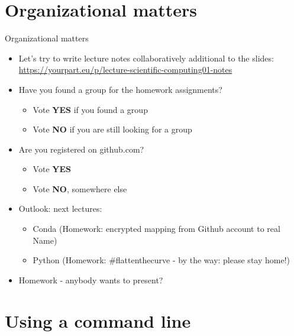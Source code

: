 
\subtitle{Command line, GIT and version control}
\date{2020-03-19}


\begin{frame}

	\tableofcontents

\end{frame}

\section{Organizational matters}
\begin{frame}[fragile]{Organizational matters}
    \begin{itemize}
        \item Let's try to write lecture notes collaboratively additional to the slides:
            \href{https://yourpart.eu/p/lecture-scientific-computing01-notes}{https://yourpart.eu/p/lecture-scientific-computing01-notes}\pause
        \item Have you found a group for the homework assignments?
        \begin{itemize}
            \item Vote {\bf YES} if you found a group
            \item Vote {\bf NO} if you are still looking for a group
        \end{itemize}\pause
        \item Are you registered on github.com?
        \begin{itemize}
            \item Vote {\bf YES}
            \item Vote {\bf NO}, somewhere else
        \end{itemize}\pause
        \item Outlook: next lectures:
            \begin{itemize}
                \item Conda (Homework: encrypted mapping from Github account to real Name)
                \item Python (Homework: \#flattenthecurve - by the way: please stay home!)
            \end{itemize}\pause
        \item Homework - anybody wants to present?
    \end{itemize}
\end{frame}


\section{Using a command line}

